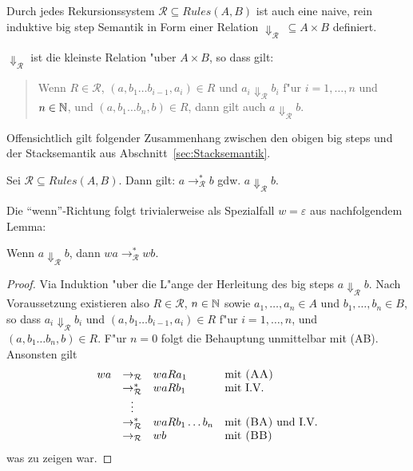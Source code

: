 \documentclass[12pt,a4paper,final]{article}
\begin{document}
Durch jedes Rekursionssystem \mbox{$\mathcal{R} \subseteq \mathit{Rules}(A,B)$} ist auch
eine naive, rein induktive big step Semantik in Form einer Relation
\mbox{$\Downarrow_{\mathcal{R}}\ \subseteq A \times B$} definiert.
\begin{definition}
  \mbox{$\Downarrow_{\mathcal{R}}$} ist die kleinste Relation "uber $A \times B$, so dass gilt:
  \begin{quote}
    Wenn $R \in \mathcal{R}$, $(a,b_1 \ldots b_{i-1},a_i) \in R$ und $a_i \Downarrow_{\mathcal{R}} b_i$
    f"ur $i=1,\ldots,n$ und $n \in \mathbb N$, und $(a,b_1 \ldots b_n,b) \in R$, dann gilt auch
    $a \Downarrow_{\mathcal{R}} b$.
  \end{quote}
\end{definition}
Offensichtlich gilt folgender Zusammenhang zwischen den obigen big steps und der Stacksemantik
aus Abschnitt~\ref{sec:Stacksemantik}.
\begin{theorem}
  Sei \mbox{$\mathcal{R} \subseteq \mathit{Rules}(A,B)$}. Dann gilt:
 \mbox{$a \rightarrow_{\mathcal{R}}^* b$} gdw. \mbox{$a \Downarrow_{\mathcal{R}} b$}.
\end{theorem}
Die ``wenn''-Richtung folgt trivialerweise als Spezialfall \mbox{$w = \varepsilon$} aus nachfolgendem
Lemma:
\begin{lemma}
  Wenn \mbox{$a \Downarrow_{\mathcal{R}} b$}, dann \mbox{$wa \rightarrow_{\mathcal{R}}^* wb$}.
\end{lemma}

\begin{proof}
  Via Induktion "uber die L"ange der Herleitung des big steps \mbox{$a \Downarrow_{\mathcal{R}} b$}.
  Nach Voraussetzung existieren also \mbox{$R \in \mathcal{R}$}, \mbox{$n \in \mathbb N$} sowie
  \mbox{$a_1,\ldots,a_n \in A$} und \mbox{$b_1,\ldots,b_n \in B$}, so dass
  \mbox{$a_i \Downarrow_{\mathcal{R}} b_i$} und \mbox{$(a,b_1 \ldots b_{i-1},a_i) \in R$}
  f"ur \mbox{$i=1,\ldots,n$}, und \mbox{$(a,b_1 \ldots b_n,b) \in R$}.
  F"ur \mbox{$n = 0$} folgt die Behauptung unmittelbar mit \textsc{(AB)}. Ansonsten gilt
  \[\begin{array}{rcll}
    wa
    & \rightarrow_{\mathcal{R}}
    & waRa_1
    & \text{mit \textsc{(AA)}} \\
    & \rightarrow_{\mathcal{R}}^*
    & waRb_1
    & \text{mit I.V.} \\
    & \vdots & \\
    & \rightarrow_{\mathcal{R}}^*
    & waRb_1 \ldots b_n
    & \text{mit \textsc{(BA)} und I.V.} \\
    & \rightarrow_{\mathcal{R}}
    & wb
    & \text{mit \textsc{(BB)}} \\
  \end{array}\]
  was zu zeigen war.
\end{proof}
\end{document}
